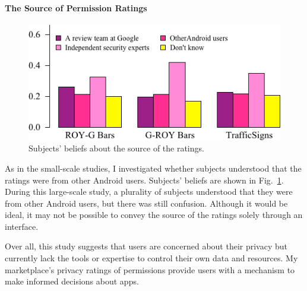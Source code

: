 \documentclass[11pt]{article}
\begin{document}
\paragraph{The Source of Permission Ratings}
\label{s-source}

\begin{figure}
\begin{center}
\includegraphics[width=.9\linewidth]{graphs/SourceBeliefs.png}
    \caption{Subjects' beliefs about the source of the ratings.}
    \label{src-beliefs}
    \end{center}
\end{figure}

As in the small-scale studies, I investigated whether subjects understood 
that the ratings were from other Android users. Subjects' beliefs are shown 
in Fig.~\ref{src-beliefs}.
During 
this large-scale study, a plurality of subjects understood that they were from other 
Android users, but there was still confusion. 
Although it would be ideal, it may not be possible to convey the 
source of the ratings solely through an interface. 


Over all, this study suggests that users are 
concerned about their privacy but currently lack the tools 
or expertise to control their own data and resources. My 
marketplace's privacy ratings of permissions provide users
with a mechanism to make informed decisions about apps.
\end{document}
